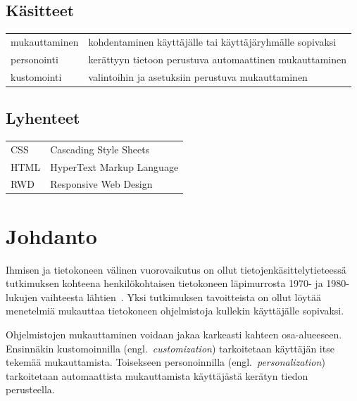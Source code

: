 \documentclass[finnish, 12pt, a4paper, elec, utf8, a-1b, online]{aaltothesis}
\date{xx.xx.2022}
\begin{document}
\makecoverpage{}

\makecopyrightpage{}

\begin{abstractpage}[finnish]
\end{abstractpage}

\thesistableofcontents{}


\subsection*{Käsitteet}

\begin{tabular}{ll}
    mukauttaminen & kohdentaminen käyttäjälle tai käyttäjäryhmälle sopivaksi \\
    personointi   & kerättyyn tietoon perustuva automaattinen mukauttaminen  \\
    kustomointi   & valintoihin ja asetuksiin perustuva mukauttaminen
\end{tabular}

\subsection*{Lyhenteet}

\begin{tabular}{ll}
    CSS  & Cascading Style Sheets    \\
    HTML & HyperText Markup Language \\
    RWD  & Responsive Web Design
\end{tabular}

\cleardoublepage{}

\section{Johdanto}

Ihmisen ja tietokoneen välinen vuorovaikutus on ollut tietojenkäsittelytieteessä
tutkimuksen kohteena henkilökohtaisen tietokoneen läpimurrosta 1970- ja
1980-lukujen vaihteesta lähtien~\cite{10.1145/800178.810088}. Yksi tutkimuksen
tavoitteista on ollut löytää menetelmiä mukauttaa tietokoneen ohjelmistoja
kullekin käyttäjälle sopivaksi.

Ohjelmistojen mukauttaminen voidaan jakaa karkeasti kahteen osa-alueeseen.
Ensinnäkin kustomoinnilla (engl.~\textit{customization}) tarkoitetaan käyttäjän
itse tekemää mukauttamista. Toisekseen personoinnilla
(engl.~\textit{personalization}) tarkoitetaan automaattista mukauttamista
käyttäjästä kerätyn tiedon perusteella.~\cite{10.1108/03090560710737534}
\end{document}

